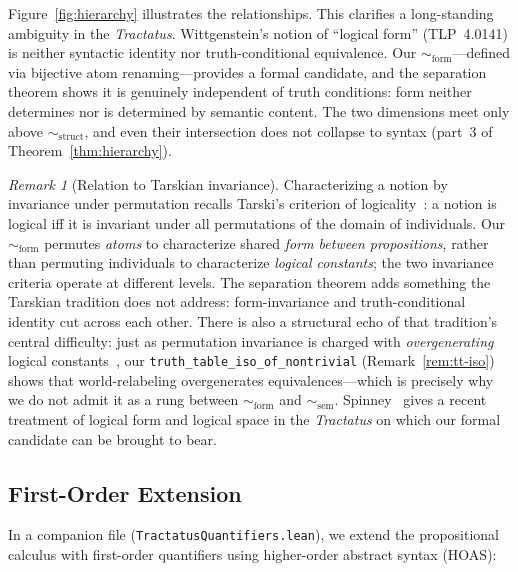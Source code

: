 \documentclass[10pt, letterpaper]{article}
\theoremstyle{definition}
\theoremstyle{remark}
\newtheorem{remark}[theorem]{Remark}
\newcommand{\structEq}{\sim_{\mathrm{struct}}}
\newcommand{\formEq}{\sim_{\mathrm{form}}}
\newcommand{\semEq}{\sim_{\mathrm{sem}}}
\begin{document}
\noindent
Figure~\ref{fig:hierarchy} illustrates the relationships.  This
clarifies a long-standing ambiguity in the
\emph{Tractatus}.  Wittgenstein's notion of ``logical form''
(TLP~4.0141) is neither syntactic identity nor truth-conditional
equivalence.  Our $\formEq$---defined via bijective atom
renaming---provides a formal candidate, and the separation
theorem shows it is genuinely independent of truth conditions:
form neither determines nor is determined by semantic content.
The two dimensions meet only above $\structEq$, and even their
intersection does not collapse to syntax
(part~3 of Theorem~\ref{thm:hierarchy}).

\begin{remark}[Relation to Tarskian invariance]
\label{rem:tarski}
Characterizing a notion by invariance under permutation recalls
Tarski's criterion of logicality~\cite{tarski1986}: a notion is
logical iff it is invariant under all permutations of the domain
of individuals.  Our $\formEq$ permutes \emph{atoms} to
characterize shared \emph{form between propositions}, rather
than permuting individuals to characterize \emph{logical
constants}; the two invariance criteria operate at different
levels.  The separation theorem adds something the Tarskian
tradition does not address: form-invariance and
truth-conditional identity cut across each other.  There is also
a structural echo of that tradition's central difficulty: just
as permutation invariance is charged with \emph{overgenerating}
logical constants~\cite{sher1991,bonnay2008}, our
\texttt{truth\_table\_iso\_of\_nontrivial}
(Remark~\ref{rem:tt-iso}) shows that world-relabeling
overgenerates equivalences---which is precisely why we do not
admit it as a rung between $\formEq$ and $\semEq$.
Spinney~\cite{spinney2022} gives a recent treatment of logical
form and logical space in the \emph{Tractatus} on which our
formal candidate can be brought to bear.
\end{remark}

\subsection{First-Order Extension}
\label{sec:firstorder}

In a companion file (\texttt{TractatusQuantifiers.lean}), we
extend the propositional calculus with first-order quantifiers
using higher-order abstract syntax (HOAS):
\end{document}
